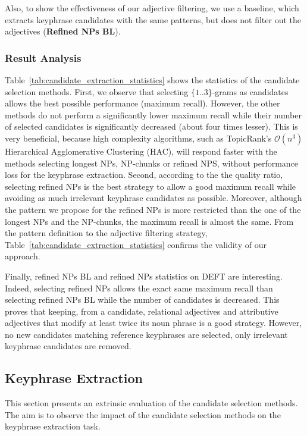      Also, to show the effectiveness of our adjective filtering, we use a
      baseline, which extracts keyphrase candidates with the same patterns, but
      does not filter out the adjectives (\textbf{Refined NPs BL}).

    \subsubsection{Result Analysis}
    \label{subsubsec:candidate_extraction_result_analysis}
      Table~\ref{tab:candidate_extraction_statistics} shows the statistics of
      the candidate selection methods. First, we observe that selecting
      $\{1..3\}$-grams as candidates allows the best possible performance
      (maximum recall). However, the other methods do not perform a
      significantly lower maximum recall while their number of selected
      candidates is significantly decreased (about four times lesser). This is
      very beneficial, because high complexity algorithms, such as TopicRank's
      $\mathcal{O}(n^3)$ Hierarchical Agglomerative Clustering (HAC), will
      respond faster with the methods selecting longest NPs, NP-chunks or
      refined NPS, without performance loss for the keyphrase extraction.
      Second, according to the the quality ratio, selecting refined NPs is the
      best strategy to allow a good maximum recall while avoiding as much
      irrelevant keyphrase candidates as possible. Moreover, although the
      pattern we propose for the refined NPs is more restricted than the one of
      the longest NPs and the NP-chunks, the maximum recall is almost the same.
      From the pattern definition to the adjective filtering strategy,
      Table~\ref{tab:candidate_extraction_statistics} confirms the validity of
      our approach.

      Finally, refined NPs BL and refined NPs statistics on DEFT are
      interesting. Indeed, selecting refined NPs allows the exact same maximum
      recall than selecting refined NPs BL while the number of candidates is
      decreased. This proves that keeping, from a candidate, relational
      adjectives and attributive adjectives that modify at least twice its noun
      phrase is a good strategy. However, no new candidates matching reference
      keyphrases are selected, only irrelevant keyphrase candidates are removed.

  \subsection{Keyphrase Extraction}
  \label{subsec:keyphrase_extraction}
    This section presents an extrinsic evaluation of the candidate selection
    methods. The aim is to observe the impact of the candidate selection
    methods on the keyphrase extraction task.

